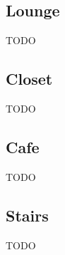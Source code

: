 \subsection{Lounge}
TODO

\subsection{Closet}
TODO

\subsection{Cafe}
TODO

\subsection{Stairs}
TODO
